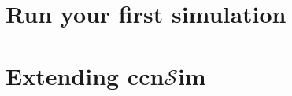 \documentclass{article}
\newcommand{\ccnsim}{ccn$\mathcal{S}$im}
\begin{document}
\section{Run your first simulation}
\section{Extending \ccnsim}
\end{document}
